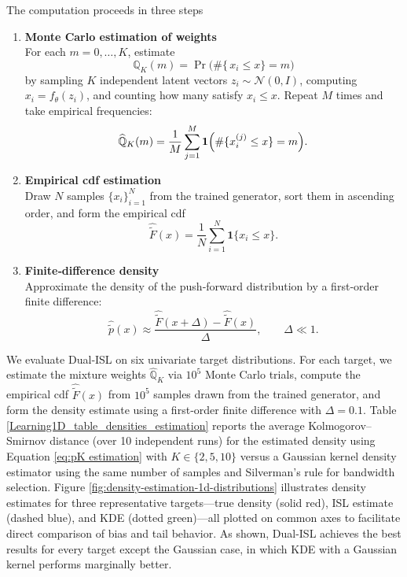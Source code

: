\documentclass{article}
\begin{document}
The computation proceeds in three steps

\begin{enumerate}
  \item \textbf{Monte Carlo estimation of weights} \\
    For each \(m = 0,\dots,K\), estimate
    \[
      \mathbb{Q}_K(m)
      = \Pr\bigl(\#\{\,x_i \le x\}=m\bigr)
    \]
    by sampling \(K\) independent latent vectors \(z_i\sim\mathcal{N}(0,I)\), computing \(x_i = f_{\theta}(z_i)\), and counting how many satisfy \(x_i \le x\).  Repeat \(M\) times and take empirical frequencies:
    \[
      \widehat{\mathbb{Q}}_K(m)
      = \frac{1}{M}\sum_{j=1}^M \mathbf{1}\Bigl(\#\{x_i^{(j)} \le x\}=m\Bigr).
    \]

  \item \textbf{Empirical cdf estimation} \\
    Draw \(N\) samples \(\{x_i\}_{i=1}^N\) from the trained generator,
    sort them in ascending order, and form the empirical cdf
    \[
      \widehat{\tilde F}(x)
      = \frac{1}{N} \sum_{i=1}^N \mathbf{1}\{x_i \le x\}.
    \]

  \item \textbf{Finite‐difference density} \\
    Approximate the density of the push‐forward distribution by a first‐order finite difference:
    \[
      \widehat{\tilde p}(x)
      \approx \frac{\widehat{\tilde F}(x + \Delta) - \widehat{\tilde F}(x)}{\Delta},
      \qquad \Delta \ll 1.
    \]
\end{enumerate}

We evaluate Dual‐ISL on six univariate target distributions.  For each target, we estimate the mixture weights \(\widehat{\mathbb{Q}}_{K}\) via \(10^{5}\) Monte Carlo trials, compute the empirical cdf \(\widehat{\tilde F}(x)\) from \(10^{5}\) samples drawn from the trained generator, and form the density estimate using a first‐order finite difference with \(\Delta = 0.1\). Table \ref{Learning1D_table_densities_estimation} reports the average Kolmogorov–Smirnov distance (over 10 independent runs) for the estimated density using Equation \ref{eq:pK estimation} with $K\in\{2,5,10\}$ versus a Gaussian kernel density estimator using the same number of samples and Silverman’s rule for bandwidth selection. Figure \ref{fig:density-estimation-1d-distributions} illustrates density estimates for three representative targets—true density (solid red), ISL estimate (dashed blue), and KDE (dotted green)—all plotted on common axes to facilitate direct comparison of bias and tail behavior. As shown, Dual-ISL achieves the best results for every target except the Gaussian case, in which KDE with a Gaussian kernel performs marginally better.
\end{document}
